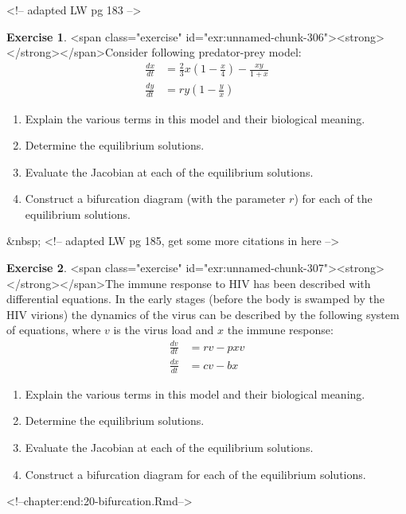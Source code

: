 \documentclass[
]{book}
\theoremstyle{definition}
\theoremstyle{definition}
\theoremstyle{definition}
\newtheorem{exercise}{Exercise}[chapter]
\theoremstyle{remark}
\begin{document}
<!-- adapted LW pg 183 -->
\begin{exercise}
<span class="exercise" id="exr:unnamed-chunk-306"><strong>\label{exr:unnamed-chunk-306} </strong></span>Consider following predator-prey model:
    \begin{align*}
\frac{dx}{dt}&=\frac{2}{3}x\left(1 - \frac{x}{4} \right) - \frac{xy}{1+x} \\
\frac{dy}{dt} &= ry\left(1 - \frac{y}{x} \right)
\end{align*}

\begin{enumerate}
\item Explain the various terms in this model and their biological meaning.
\item Determine the equilibrium solutions.
\item Evaluate the Jacobian at each of the equilibrium solutions.
\item Construct a bifurcation diagram (with the parameter $r$) for each of the equilibrium solutions.
\end{enumerate}
\end{exercise}
&nbsp;
<!-- adapted LW pg 185, get some more citations in here -->
\begin{exercise}
<span class="exercise" id="exr:unnamed-chunk-307"><strong>\label{exr:unnamed-chunk-307} </strong></span>The immune response to HIV has been described with differential equations.  In the early stages (before the body is swamped by the HIV virions) the dynamics of the virus can be described by the following system of equations, where $v$ is the virus load and $x$ the immune response:
    \begin{align*}
\frac{dv}{dt}&=rv - pxv \\
\frac{dx}{dt} &= cv-bx
\end{align*}

\begin{enumerate}
\item Explain the various terms in this model and their biological meaning.
\item Determine the equilibrium solutions.
\item Evaluate the Jacobian at each of the equilibrium solutions.
\item Construct a bifurcation diagram for each of the equilibrium solutions.
\end{enumerate}
\end{exercise}


<!--chapter:end:20-bifurcation.Rmd-->
\end{document}
